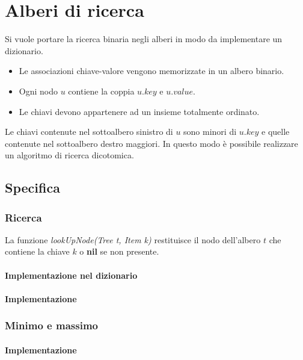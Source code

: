 \chapter{Alberi di ricerca}
Si vuole portare la ricerca binaria negli alberi in modo da implementare un dizionario.
\begin{itemize}
\item Le associazioni chiave-valore vengono memorizzate in un albero binario.
\item Ogni nodo $u$ contiene la coppia $u.key$ e $u.value$.
\item Le chiavi devono appartenere ad un insieme totalmente ordinato.
\end{itemize}
Le chiavi contenute nel sottoalbero sinistro di $u$ sono minori di $u.key$ e quelle contenute nel sottoalbero destro maggiori. In questo modo \`e possibile
realizzare un algoritmo di ricerca dicotomica.
\section{Specifica}


\newpage
\subsection{Ricerca}
La funzione \emph{lookUpNode(Tree t, Item k)} restituisce il nodo dell'albero $t$ che contiene la chiave $k$ o \textbf{nil} se non presente.
\subsubsection{Implementazione nel dizionario}

\subsubsection{Implementazione}
\begin{multicols}{2}


\end{multicols}
\subsection{Minimo e massimo}
\subsubsection{Implementazione}
\begin{multicols}{2}

\columnbreak

\end{multicols}
